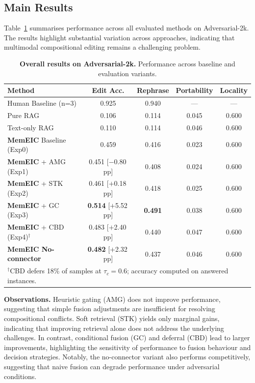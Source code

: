 \documentclass{article}
\newcommand{\memeic}{\textbf{MemEIC}}
\begin{document}
\subsection{Main Results}
\label{sec:main_results}

Table~\ref{tab:adv2k_main} summarises performance across all evaluated methods on Adversarial-2k. The results highlight substantial variation across approaches, indicating that multimodal compositional editing remains a challenging problem.

\begin{table}[h]
\centering
\caption{\textbf{Overall results on Adversarial-2k.} Performance across baseline and evaluation variants.}
\label{tab:adv2k_main}
\small
\begin{tabular}{@{}lcccc@{}}
\toprule
\textbf{Method} & \textbf{Edit Acc.} & \textbf{Rephrase} & \textbf{Portability} & \textbf{Locality} \\
\midrule
Human Baseline (n=3)        & 0.925 & 0.940 & --- & --- \\
\midrule
Pure RAG                    & 0.106 & 0.114 & 0.045 & 0.600 \\
Text-only RAG               & 0.110 & 0.114 & 0.046 & 0.600 \\
\midrule
\memeic{} Baseline (Exp0)   & 0.459 & 0.416 & 0.023 & 0.600 \\
\memeic{} + AMG (Exp1)      & 0.451 [$-$0.80\,pp] & 0.408 & 0.024 & 0.600 \\
\memeic{} + STK (Exp2)      & 0.461 [$+$0.18\,pp] & 0.418 & 0.025 & 0.600 \\
\memeic{} + GC (Exp3)       & \textbf{0.514} [$+$5.52\,pp] & \textbf{0.491} & 0.038 & 0.600 \\
\memeic{} + CBD (Exp4)$^\dagger$ & 0.483 [$+$2.40\,pp] & 0.440 & 0.047 & 0.600 \\
\textbf{\memeic{} No-connector} & \textbf{0.482} [$+$2.32\,pp] & 0.437 & 0.046 & 0.600 \\
\bottomrule
\multicolumn{5}{l}{\small $^\dagger$CBD defers 18\% of samples at $\tau_c=0.6$; accuracy computed on answered instances.}
\end{tabular}
\end{table}

\textbf{Observations.}
Heuristic gating (AMG) does not improve performance, suggesting that simple fusion adjustments are insufficient for resolving compositional conflicts. Soft retrieval (STK) yields only marginal gains, indicating that improving retrieval alone does not address the underlying challenges. In contrast, conditional fusion (GC) and deferral (CBD) lead to larger improvements, highlighting the sensitivity of performance to fusion behaviour and decision strategies. Notably, the no-connector variant also performs competitively, suggesting that naive fusion can degrade performance under adversarial conditions.
\end{document}
